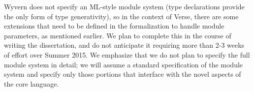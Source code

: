 Wyvern does not specify an ML-style module system (type declarations provide the only form of type generativity), so in the context of Verse, there are some extensions that need to be defined in the formalization to handle module parameters, as mentioned earlier. We plan to complete this in the course of writing the dissertation, and do not anticipate it requiring more than 2-3 weeks of effort over Summer 2015. We emphasize that we do not plan to specify the full module system in detail; we will assume a standard specification of the module system and specify only those portions that interface with the novel aspects of the core language.


